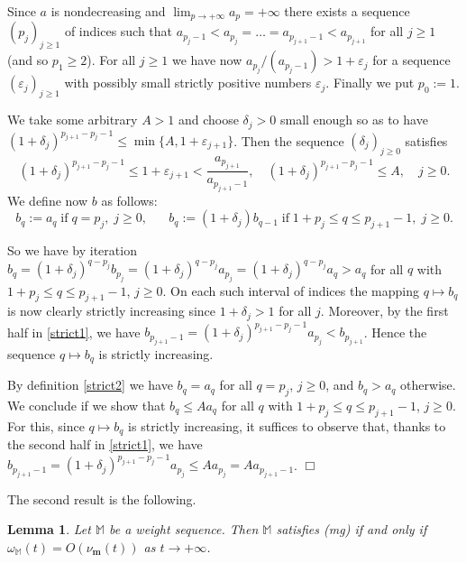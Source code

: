 \documentclass[11pt,a4paper]{article}
\theoremstyle{plain}
\newtheorem{lemma}[theo]{Lemma}
\theoremstyle{definition}
\newenvironment{proof1}{\medskip\par\noindent{\bf Proof.}}{\hfill $\Box$
\medskip\par}
\newcommand{\M}{\mathbb{M}}
\newcommand{\m}{\boldsymbol{m}}
\begin{document}
\begin{proof1}
Since $a$ is nondecreasing and $\lim_{p\rightarrow+\infty}a_p=+\infty$ there exists a sequence $(p_j)_{j\ge 1}$ of indices such that  $a_{p_j-1}<a_{p_j}=\dots=a_{p_{j+1}-1}<a_{p_{j+1}}$ for all $j\ge 1$ (and so $p_1\ge 2$). For all $j\ge 1$ we have now $a_{p_j}/(a_{p_j-1})>1+\varepsilon_j$ for a sequence $(\varepsilon_j)_{j\ge 1}$ with possibly small strictly positive numbers $\varepsilon_j$. Finally we put $p_0:=1$.\vspace{6pt}

We take some arbitrary $A>1$ and choose $\delta_j>0$ small enough so as to have $(1+\delta_j)^{p_{j+1}-p_j-1}\le\min\{A,1+\varepsilon_{j+1}\}$. Then the sequence $(\delta_j)_{j\ge 0}$ satisfies
\begin{equation}\label{strict1}
(1+\delta_j)^{p_{j+1}-p_j-1}\le 1+\varepsilon_{j+1}<\frac{a_{p_{j+1}}}{a_{p_{j+1}-1}},\quad (1+\delta_j)^{p_{j+1}-p_j-1}\le A,\quad j\ge 0.
\end{equation}
We define now $b$ as follows:
\begin{equation}\label{strict2}
b_q:=a_q\;\text{if}\;q=p_j,\;j\ge 0,\hspace{20pt}b_q:=(1+\delta_j)b_{q-1}\;\text{if}\;1+p_j\le q\le p_{j+1}-1,\;j\ge 0.
\end{equation}

So we have by iteration $b_q=(1+\delta_j)^{q-p_j}b_{p_j}=(1+\delta_j)^{q-p_j}a_{p_j}=(1+\delta_j)^{q-p_j}a_q>a_q$  for all $q$ with $1+p_j\le q\le p_{j+1}-1$, $j\ge 0$. On each such interval of indices the mapping $q\mapsto b_q$ is now clearly strictly increasing since $1+\delta_j>1$ for all $j$.
Moreover, by the first half in \eqref{strict1}, we have $b_{p_{j+1}-1}=(1+\delta_j)^{p_{j+1}-p_j-1}a_{p_j}<b_{p_{j+1}}$.
Hence the sequence $q\mapsto b_q$ is strictly increasing.\vspace{6pt}

By definition \eqref{strict2} we have $b_q=a_q$ for all $q=p_j$, $j\ge 0$, and $b_q>a_q$ otherwise. We conclude if we show that $b_q\le A a_q$ for all $q$ with $1+p_j\le q\le p_{j+1}-1$, $j\ge 0$. For this, since $q\mapsto b_q$ is strictly increasing, it suffices to observe that, thanks to the second half in \eqref{strict1}, we have $b_{p_{j+1}-1}=(1+\delta_j)^{p_{j+1}-p_j-1}a_{p_j}\le Aa_{p_j}=Aa_{p_{j+1}-1}$.
\end{proof1}

The second result is the following.

\begin{lemma}\label{equivalenceofdual}
Let $\M$ be a weight sequence. Then $\M$ satisfies (mg) if and only if
$\omega_\M(t)=O(\nu_{\m}(t))$ as $t\rightarrow+\infty$.
\end{lemma}
\end{document}
